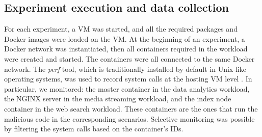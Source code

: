 \subsection{Experiment execution and data collection}
For each experiment, a VM was started, and all the required packages and Docker images were loaded on the VM. At the beginning of an experiment, a Docker network was instantiated, then all containers required in the workload were created and started. The containers were all connected to the same Docker network. The \emph{perf} tool, which is traditionally installed by default in Unix-like operating systems, was used to record system calls at the hosting VM level \cite{perf}. In particular, we monitored: the master container in the data analytics workload, the NGINX server in the media streaming workload, and the index node container in the web search workload. These containers are the ones that run the malicious code in the corresponding scenarios. Selective monitoring was possible by filtering the system calls based on the container's IDs.





